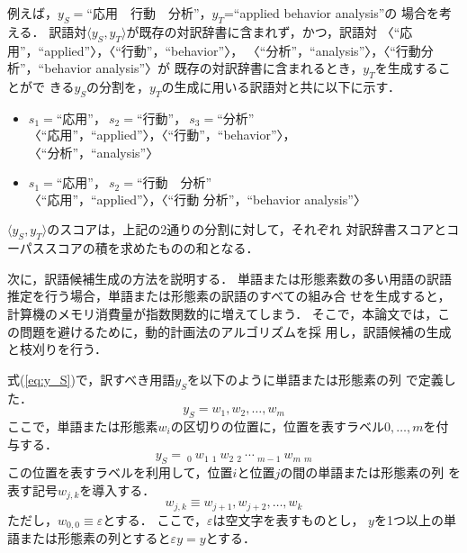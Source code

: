 \documentclass[japanese]{jnlp_1.3a}
\begin{document}
例えば，$y_S=$“応用　行動　分析”，$y_T$=``applied behavior analysis''の
場合を考える．
訳語対$\langle y_S,y_T\rangle$が既存の対訳辞書に含まれず，かつ，訳語対
〈“応用”，``applied''〉，〈“行動”，``behavior''〉，
〈“分析”，``analysis''〉，〈“行動分析”，``behavior analysis''〉が
既存の対訳辞書に含まれるとき，$y_T$を生成することがで
きる$y_S$の分割を，$y_T$の生成に用いる訳語対と共に以下に示す．
\begin{itemize}
  

 \item $s_1=\mbox{“応用”，}\ s_2=\mbox{“行動”，}\ s_3=\mbox{“分析”}$\\
       〈“応用”，``applied''〉，〈“行動”，``behavior''〉，\\
	〈“分析”，``analysis''〉
 \item $s_1=\mbox{“応用”，}\ s_2=\mbox{“行動　分析”}$\\
       〈“応用”，``applied''〉，〈“行動 分析”，``behavior analysis''〉
\end{itemize}
$\langle y_S,y_T\rangle$のスコアは，上記の2通りの分割に対して，それぞれ
対訳辞書スコアとコーパススコアの積を求めたものの和となる．

次に，訳語候補生成の方法を説明する．
単語または形態素数の多い用語の訳語推定を行う場合，単語または形態素の訳語のすべての組み合
せを生成すると，計算機のメモリ消費量が指数関数的に増えてしまう．
そこで，本論文では，この問題を避けるために，動的計画法のアルゴリズムを採
用し，訳語候補の生成と枝刈りを行う．

式(\ref{eq:y_S})で，訳すべき用語$y_S$を以下のように単語または形態素の列
で定義した．
\[
 y_S=w_1,w_2,\ldots,w_m
\]
ここで，単語または形態素$w_i$の区切りの位置に，位置を表すラベル$0, \ldots,
m$を付与する．
\begin{equation}
 y_S = \ _0 \ w_1 \ _1 \ w_2 \ _2 \ \cdots \ _{m-1} \ w_m \ _{m}
\end{equation}
この位置を表すラベルを利用して，位置$i$と位置$j$の間の単語または形態素の列
を表す記号$w_{j,k}$を導入する．
\begin{equation}
 w_{j,k} \equiv w_{j+1}, w_{j+2}, \ldots, w_{k}
\end{equation}
ただし，$w_{0,0} \equiv \varepsilon$とする．
ここで，$\varepsilon$は空文字を表すものとし，
$y$を1つ以上の単語または形態素の列とすると$\varepsilon y=y$とする．
\end{document}
